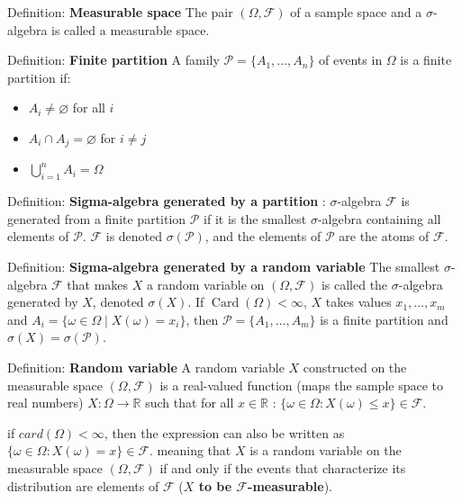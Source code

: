 \documentclass[12pt,a4paper]{article}
\begin{document}
\vspace{1em}

Definition: \textbf{Measurable space}
\vspace{0.5em}
The pair $(\Omega, \mathcal{F})$ of a sample space and a $\sigma$-algebra is called a measurable space.
\vspace{1em}

Definition: \textbf{Finite partition}
\vspace{0.5em}
A family $\mathcal{P} = \{A_1, \ldots, A_n\}$ of events in $\Omega$ is a finite partition if:
\begin{itemize}
	\item[PF1:] $A_i \neq \varnothing$ for all $i$
	\item[PF2:] $A_i \cap A_j = \varnothing$ for $i \neq j$
	\item[PF3:] $\bigcup_{i=1}^n A_i = \Omega$
\end{itemize}
\vspace{1em}


Definition: \textbf{Sigma-algebra generated by a partition} : $\sigma$-algebra $\mathcal{F}$ is generated from a finite partition $\mathcal{P}$ if it is the smallest $\sigma$-algebra containing all elements of $\mathcal{P}$. $\mathcal{F}$ is denoted $\sigma(\mathcal{P})$, and the elements of $\mathcal{P}$ are the atoms of $\mathcal{F}$.
\vspace{1em}

Definition: \textbf{Sigma-algebra generated by a random variable}
The smallest $\sigma$-algebra $\mathcal{F}$ that makes $X$ a random variable on $(\Omega, \mathcal{F})$ is called the $\sigma$-algebra generated by $X$, denoted $\sigma(X)$.
\vspace{0.5em}
If $\operatorname{Card}(\Omega) < \infty$, $X$ takes values $x_1, \ldots, x_m$ and $A_i = \{\omega \in \Omega \mid X(\omega) = x_i\}$, then $\mathcal{P} = \{A_1, \ldots, A_m\}$ is a finite partition and $\sigma(X) = \sigma(\mathcal{P})$.

\vspace{1em}
Definition: \textbf{Random variable}
A random variable $X$ constructed on the measurable space $(\Omega, \mathcal{F})$ is a real-valued function (maps the sample space to real numbers) $X : \Omega \to \mathbb{R}$ such that for all $x \in \mathbb{R}$ : $\{\omega \in \Omega : X(\omega) \leq x\} \in \mathcal{F}$.

if $card(\Omega) < \infty$, then the expression can also be written as $\{\omega \in \Omega : X(\omega) = x\} \in \mathcal{F}$. meaning that $X$ is a random variable on the measurable space $(\Omega, \mathcal{F})$ if and only if the events that characterize its distribution are elements of $\mathcal{F}$ (\textbf{$X$ to be $\mathcal{F}$-measurable}).
\vspace{1em}
\end{document}
